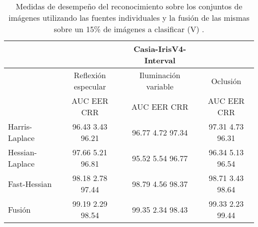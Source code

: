 \begin{table}[h]
\begin{center}
\begin{tabular}{@{}lccc@{}}
\toprule
&& Casia-IrisV4-Interval & \\ \hline
&Reflexión especular		&  	Iluminación variable		& Oclusión \\ \hline
&AUC  \phantom{aa} EER  \phantom{aa} CRR &  	AUC  \phantom{aa} EER  \phantom{aa} CRR		& AUC  \phantom{aa} EER  \phantom{aa} CRR \\ \hline
Harris-Laplace& 96.43 \phantom{aa} 3.43  \phantom{aa} 96.21 &  	96.77 \phantom{aa} 4.72  \phantom{aa}97.34		& 97.31 \phantom{aa} 4.73 \phantom{aa} 96.31 \\
Hessian-Laplace& 97.66 \phantom{aa} 5.21  \phantom{aa} 96.81 &  	95.52 \phantom{aa} 5.54 \phantom{aa} 96.77 & 96.34 \phantom{aa} 5.13 \phantom{aa} 96.54\\
Fast-Hessian& 98.18  \phantom{aa}2.78 \phantom{aa}  97.44 &  	98.79 \phantom{aa} 4.56 \phantom{aa}98.37		& 98.71  \phantom{aa}3.43 \phantom{aa} 98.64 \\
Fusión& 99.19 \phantom{aa} 2.29  \phantom{aa}98.54 &  	99.35  \phantom{aa}2.34 \phantom{aa} 98.43		& 99.33 \phantom{aa} 2.23  \phantom{aa}99.44 \\ \hline

\end{tabular}
\end{center}
\caption{Medidas de desempeño del reconocimiento sobre los conjuntos de imágenes utilizando las fuentes individuales y la fusión de las mismas sobre un 15\% de imágenes a clasificar (V) .}
\label{my_tabla}
\end{table}

\newpage

